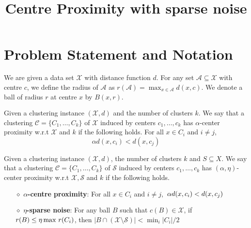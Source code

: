 \documentclass[11pt]{article}
\title{\LARGE Centre Proximity with sparse noise}
\author{}
\newcommand{\mc}{\mathcal}
\begin{document}
\maketitle

\section{Problem Statement and Notation}
We are given a data set $\mc X$ with distance function $d$. For any set $\mc A\subseteq \mc X$ with centre $c$, we define the radius of $\mc A$ as $r(\mc A) = \max_{x \in \mc A} d(x, c)$. We denote a ball of radius $r$ at centre $x$ by $B(x, r)$.

\begin{definition}
\label{defn:alphacp}
Given a clustering instance $(\mc X, d)$ and the number of clusters $k$. We say that a clustering $\mc C = \{C_1, \ldots, C_k\}$ of $\mc X$ induced by centers $c_1, \ldots, c_k$ has $\alpha$-center proximity w.r.t $\mc X$ and $k$ if the following holds. For all $x \in C_i$ and $i\neq j$, 
$$\alpha d(x, c_i) < d(x, c_j)$$
\end{definition}

\begin{definition}
Given a clustering instance $(\mc X, d)$, the number of clusters $k$ and $S \subseteq X$. We say that a clustering $\mc C = \{C_1, \ldots, C_k\}$ of $\mc S$ induced by centers $c_1, \ldots, c_k$ has $(\alpha, \eta)$-center proximity w.r.t $\mc X, \mc S$ and $k$ if the following holds.

\begin{itemize}[nolistsep, noitemsep]
\label{defn:alphacpnoise}	

\item[$\diamond$] {\bf $\alpha$-centre proximity}: For all $x \in C_i$ and $i\neq j$, $\thinspace\alpha d(x, c_i) < d(x, c_j)$
\item[$\diamond$]{\bf $\eta$-sparse noise}: For any ball $B$ such that $c(B)\in \mathcal{X}$, if $r(B)\leq \eta\max \thinspace r(C_i)$, then $|B\cap (\mc X\setminus \mc S)| < \min_i |C_i|/2$
\end{itemize}
\end{definition}

\end{document}
